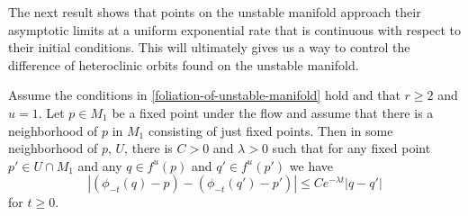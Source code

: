 The next result shows that points on the unstable manifold approach their asymptotic limits at a uniform exponential rate that is continuous with respect to their initial conditions. This will ultimately gives us a way to control the difference of heteroclinic orbits found on the unstable manifold.
\begin{prop}\label{distance-to-fixed-point}
	Assume the conditions in \cref{foliation-of-unstable-manifold} hold and that \(r\geq 2\) and \(u = 1\). Let \(p \in {M}_1\) be a fixed point under the flow and assume that there is a neighborhood of \(p\) in \(M_1\) consisting of just fixed points. Then in some neighborhood of \(p\), \(U\), there is \(C> 0 \) and \(\lambda > 0\) such that for any fixed point \(p'\in U\cap M_1\) and any \(q \in f^u(p)\) and \(q'\in f^u(p')\) we have
	\begin{equation}
		|(\phi_{-t}(q) - p) - (\phi_{-t}(q') - p')| \leq C e^{-\lambda t} | q - q'|
	\end{equation}
	for \(t\geq 0.\)
\end{prop}


